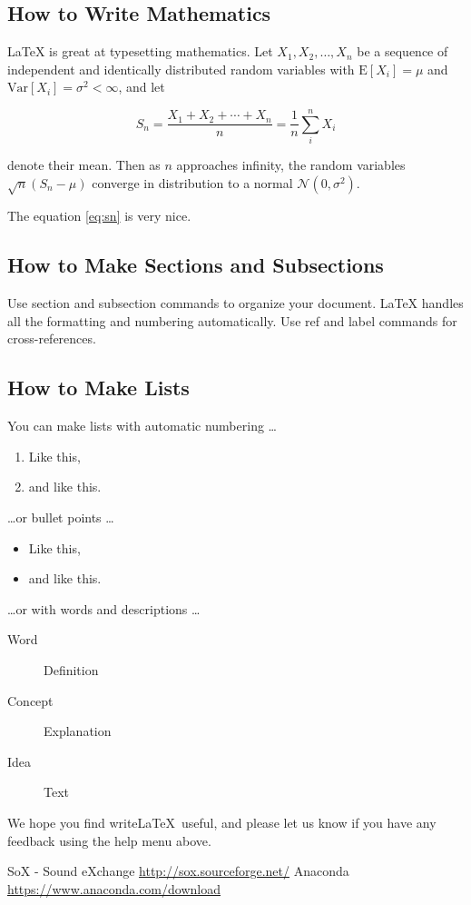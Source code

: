 \documentclass[a4paper]{article}
\begin{document}
\subsection{How to Write Mathematics}

\LaTeX{} is great at typesetting mathematics. Let $X_1, X_2, \ldots, X_n$ be a sequence of independent and identically distributed random variables with $\text{E}[X_i] = \mu$ and $\text{Var}[X_i] = \sigma^2 < \infty$, and let

\begin{equation}
S_n = \frac{X_1 + X_2 + \cdots + X_n}{n}
      = \frac{1}{n}\sum_{i}^{n} X_i
\label{eq:sn}
\end{equation}

denote their mean. Then as $n$ approaches infinity, the random variables $\sqrt{n}(S_n - \mu)$ converge in distribution to a normal $\mathcal{N}(0, \sigma^2)$.

The equation \ref{eq:sn} is very nice.

\subsection{How to Make Sections and Subsections}

Use section and subsection commands to organize your document. \LaTeX{} handles all the formatting and numbering automatically. Use ref and label commands for cross-references.

\subsection{How to Make Lists}

You can make lists with automatic numbering \dots

\begin{enumerate}
\item Like this,
\item and like this.
\end{enumerate}
\dots or bullet points \dots
\begin{itemize}
\item Like this,
\item and like this.
\end{itemize}
\dots or with words and descriptions \dots
\begin{description}
\item[Word] Definition
\item[Concept] Explanation
\item[Idea] Text
\end{description}

We hope you find write\LaTeX\ useful, and please let us know if you have any feedback using the help menu above.

\begin{thebibliography}{9}
  SoX - Sound eXchange \url{http://sox.sourceforge.net/}
  Anaconda \url{https://www.anaconda.com/download}
\end{thebibliography}
\end{document}
